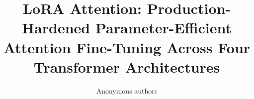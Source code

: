 \title{\textbf{LoRA Attention: Production-Hardened Parameter-Efficient Attention Fine-Tuning Across Four Transformer Architectures}}

\author{Anonymous authors}
